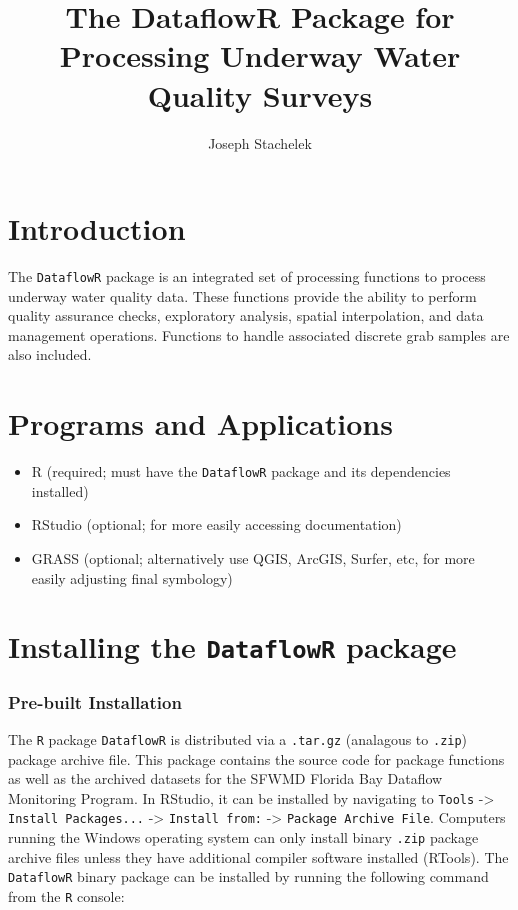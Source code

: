 \documentclass[12pt]{article}
\author{Joseph Stachelek}
\title{The DataflowR Package for Processing Underway Water Quality Surveys}
\begin{document}

\maketitle
\tableofcontents
 
\vspace{15pt}
\section{Introduction}

The \texttt{DataflowR} package is an integrated set of processing functions to process underway water quality data. These functions provide the ability to perform quality assurance checks, exploratory analysis, spatial interpolation, and data management operations. Functions to handle associated discrete grab samples are also included.

\section{Programs and Applications}

\begin{itemize}
  \item R (required; must have the \texttt{DataflowR} package and its dependencies installed) 
  \item RStudio (optional; for more easily accessing documentation)
  \item GRASS (optional; alternatively use QGIS, ArcGIS, Surfer, etc, for more easily adjusting final symbology)
\end{itemize}
 
\section{Installing the \texttt{DataflowR} package}

\subsubsection{Pre-built Installation}
The \texttt{R} package \texttt{DataflowR} is distributed via a \texttt{.tar.gz} (analagous to \texttt{.zip}) package archive file. This package contains the source code for package functions as well as the archived datasets for the SFWMD Florida Bay Dataflow Monitoring Program. In RStudio, it can be installed by navigating to \texttt{Tools} -> \texttt{Install Packages...} -> \texttt{Install from:} -> \texttt{Package Archive File}. Computers running the Windows operating system can only install binary \texttt{.zip} package archive files unless they have additional compiler software installed (RTools). The \texttt{DataflowR} binary package can be installed by running the following command from the \texttt{R} console:
\end{document}
